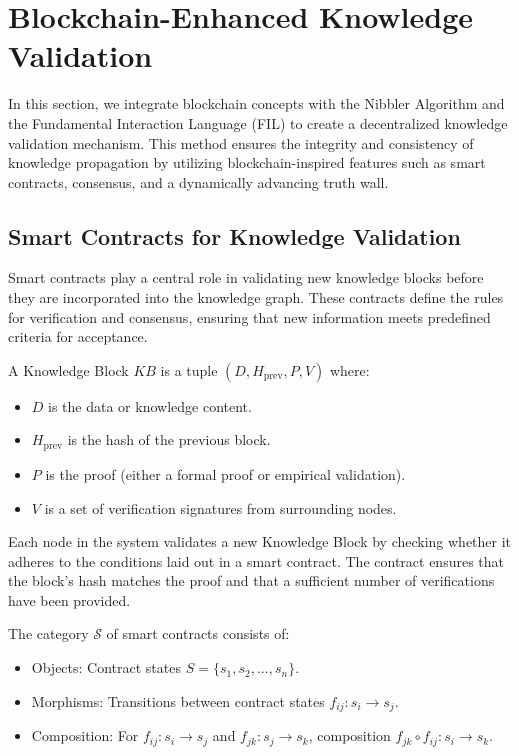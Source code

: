 \section{Blockchain-Enhanced Knowledge Validation}

In this section, we integrate blockchain concepts with the Nibbler Algorithm and the Fundamental Interaction Language (FIL) to create a decentralized knowledge validation mechanism. This method ensures the integrity and consistency of knowledge propagation by utilizing blockchain-inspired features such as smart contracts, consensus, and a dynamically advancing truth wall.

\subsection{Smart Contracts for Knowledge Validation}
Smart contracts play a central role in validating new knowledge blocks before they are incorporated into the knowledge graph. These contracts define the rules for verification and consensus, ensuring that new information meets predefined criteria for acceptance.

\begin{definition}
A Knowledge Block $KB$ is a tuple $(D, H_{\text{prev}}, P, V)$ where:
\begin{itemize}
    \item $D$ is the data or knowledge content.
    \item $H_{\text{prev}}$ is the hash of the previous block.
    \item $P$ is the proof (either a formal proof or empirical validation).
    \item $V$ is a set of verification signatures from surrounding nodes.
\end{itemize}
\end{definition}

Each node in the system validates a new Knowledge Block by checking whether it adheres to the conditions laid out in a smart contract. The contract ensures that the block's hash matches the proof and that a sufficient number of verifications have been provided.

\begin{definition}
The category $\mathcal{S}$ of smart contracts consists of:
\begin{itemize}
    \item Objects: Contract states $S = \{s_1, s_2, ..., s_n\}$.
    \item Morphisms: Transitions between contract states $f_{ij}: s_i \rightarrow s_j$.
    \item Composition: For $f_{ij}: s_i \rightarrow s_j$ and $f_{jk}: s_j \rightarrow s_k$, composition $f_{jk} \circ f_{ij}: s_i \rightarrow s_k$.
\end{itemize}
\end{definition}

